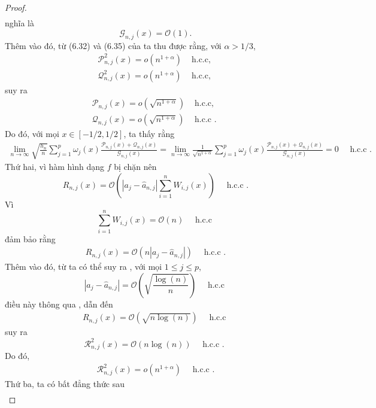 \begin{proof}
\begin{align}
    \label{9.6}
\end{align}
nghĩa là 
$$
\mathcal{G}_{n, j}(x) = \mathcal{O}(1).
$$
Thêm vào đó, từ (6.32) và (6.35) của \cite{bercu} ta thu được rằng, với $\alpha>1 / 3$,
\begin{align}
\mathcal{P}_{n, j}^{2}(x)=o\left(n^{1+\alpha}\right) & \text { h.c.c, } \label{9.7}\\
\mathcal{Q}_{n, j}^{2}(x)=o\left(n^{1+\alpha}\right) & \text { h.c.c, } \label{9.8}
\end{align}
suy ra 
$$
\begin{array}{ll}
\mathcal{P}_{n, j}(x)=o\left(\sqrt{n^{1+\alpha}}\right) & \text { h.c.c, } \\
\mathcal{Q}_{n, j}(x)=o\left(\sqrt{n^{1+\alpha}}\right) & \text { h.c.c . }
\end{array}
$$
Do đó, với mọi $x \in[-1 / 2,1 / 2]$, ta thấy rằng
\begin{align}
    \lim _{n \rightarrow \infty} \sqrt{\frac{h_{n}}{n}} \sum_{j=1}^{p} \omega_{j}(x) \frac{\mathcal{P}_{n, j}(x)+\mathcal{Q}_{n, j}(x)}{\mathcal{G}_{n, j}(x)}= \lim _{n \rightarrow \infty} \frac{1}{\sqrt{n^{1+\alpha}}} \sum_{j=1}^{p} \omega_{j}(x) \frac{\mathcal{P}_{n, j}(x)+\mathcal{Q}_{n, j}(x)}{\mathcal{G}_{n, j}(x)}=0 \quad \text { h.c.c . }
\label{9.9}
\end{align}
Thứ hai, vì hàm hình dạng $f$ bị chặn nên
$$
R_{n, j}(x)=\mathcal{O}\left(\left|a_{j}-\widehat{a}_{n, j}\right| \sum_{i=1}^{n} W_{i, j}(x)\right) \quad \text { h.c.c .}
$$
Vì
$$
\sum_{i=1}^{n} W_{i, j}(x)=\mathcal{O}(n) \quad \text { h.c.c }
$$
đảm bảo rằng
\begin{align}
    R_{n, j}(x)=\mathcal{O}\left(n\left|a_{j}-\widehat{a}_{n, j}\right|\right) \quad \text { h.c.c .}
    \label{9.10}
\end{align}
Thêm vào đó, từ  ta có thể suy ra , với mọi $1 \leq j \leq p$,
$$
\left|a_{j}-\widehat{a}_{n, j}\right|=\mathcal{O}\left(\sqrt{\frac{\log (n)}{n}}\right) \quad \text { h.c.c }
$$
điều này thông qua , dẫn đến
\begin{align}
    R_{n, j}(x)=\mathcal{O}(\sqrt{n \log (n)}) \quad \text { h.c.c }
    \label{9.11}
\end{align}
suy ra
$$
\mathcal{R}_{n, j}^{2}(x)=\mathcal{O}(n \log (n)) \quad \text { h.c.c . }
$$
Do đó,
\begin{align}
    \mathcal{R}_{n, j}^{2}(x)=o\left(n^{1+\alpha}\right) \quad \text { h.c.c .}
    \label{9.12}
\end{align}
Thứ ba, ta có bất đẳng thức sau
\begin{align}

\end{align}
\end{proof}
